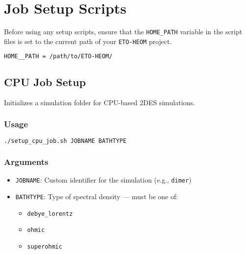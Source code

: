 \documentclass{article}
\begin{document}
\section{Job Setup Scripts}

Before using any setup scripts, ensure that the \texttt{HOME\_PATH} variable in the script files is set to the current path of your \texttt{ETO-HEOM} project.
\begin{lstlisting}[language=bash]
    HOME__PATH = /path/to/ETO-HEOM/
\end{lstlisting}


\subsection{CPU Job Setup}

Initializes a simulation folder for CPU-based 2DES simulations.

\subsubsection*{Usage}
\begin{lstlisting}[language=bash]
./setup_cpu_job.sh JOBNAME BATHTYPE
\end{lstlisting}

\subsubsection*{Arguments}
\begin{itemize}
    \item \texttt{JOBNAME}: Custom identifier for the simulation (e.g., \texttt{dimer})
    \item \texttt{BATHTYPE}: Type of spectral density — must be one of:
    \begin{itemize}
        \item \texttt{debye\_lorentz}
        \item \texttt{ohmic}
        \item \texttt{superohmic}
    \end{itemize}
\end{itemize}
\end{document}
